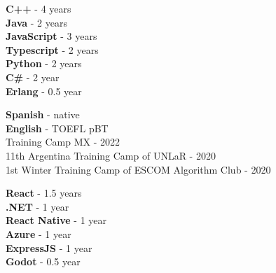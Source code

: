 \documentclass[9pt]{developercv} %
\begin{document}

\begin{minipage}[t]{0.25\textwidth}
	\vspace{-\baselineskip} %

	
	\textbf{C++} - 4 years\\
	\textbf{Java} - 2 years\\
	\textbf{JavaScript} - 3 years\\
	\textbf{Typescript} - 2 years\\
	\textbf{Python} - 2 years\\
	\textbf{C\#} - 2 year\\
    \textbf{Erlang} - 0.5 year
\end{minipage}
\hfill
\begin{minipage}[t]{0.48\textwidth}
	\vspace{-\baselineskip} %
	
	
	\textbf{Spanish} - native\\
	\textbf{English} - TOEFL pBT \\

	Training Camp MX - 2022\\
	11th Argentina Training Camp of UNLaR - 2020\\
	1st Winter Training Camp of ESCOM Algorithm Club - 2020
 
\end{minipage}
\hfill
\begin{minipage}[t]{0.17\textwidth}
	\vspace{-\baselineskip} %


    \textbf{React} - 1.5 years\\
	\textbf{.NET} - 1 year\\
    \textbf{React Native} - 1 year\\
    \textbf{Azure} - 1 year\\
    \textbf{ExpressJS} - 1 year\\
    \textbf{Godot} - 0.5 year

\end{minipage}

\end{document}
